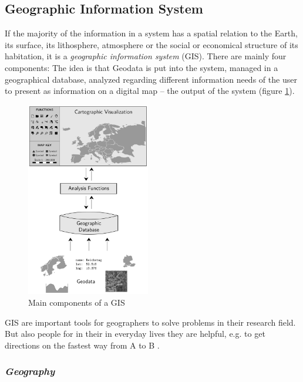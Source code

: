 


\subsection{Geographic Information System} %
\label{sub:geographic_information_system}

If the majority of the information in a system has a spatial relation to the Earth, its surface, its lithosphere, atmosphere or the social or economical structure of its habitation, it is a \emph{geographic information system} (GIS). There are mainly four components: The idea is that Geodata is put into the system, managed in a geographical database, analyzed regarding different information needs of the user to present as information on a digital map -- the output of the system (figure \ref{fig:gis_components}).

\begin{figure}[ht]
  \centering
  \includegraphics[width=0.48\textwidth]{graphics/basics/gis_components}
  \caption{Main components of a GIS}
  \label{fig:gis_components}
\end{figure}

GIS are important tools for geographers to solve problems in their research field. But also people for in their in everyday lives they are helpful, e.g. to get directions on the fastest way from A to B
\cite{ngGeography}.


\subsubsection{\emph{Geography}} %

